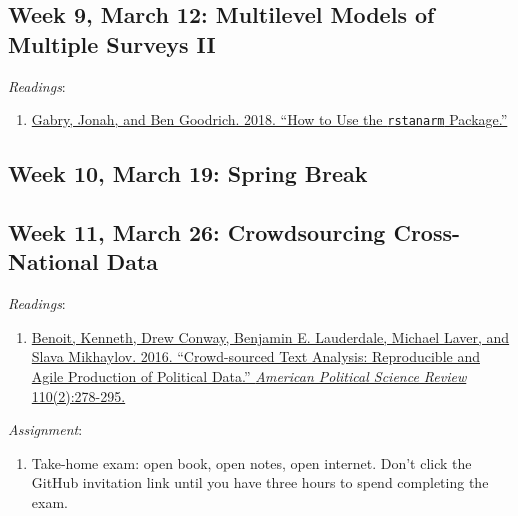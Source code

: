\documentclass[]{article}
\providecommand{\tightlist}{%
  \setlength{\itemsep}{0pt}\setlength{\parskip}{0pt}}
\begin{document}
\hypertarget{week-9-march-12-multilevel-models-of-multiple-surveys-ii}{%
\subsection{Week 9, March 12: Multilevel Models of Multiple Surveys
II}\label{week-9-march-12-multilevel-models-of-multiple-surveys-ii}}

\emph{Readings}:

\begin{enumerate}
\def\labelenumi{\arabic{enumi}.}
\tightlist
\item
  \href{http://mc-stan.org/rstanarm/articles/rstanarm.html}{Gabry,
  Jonah, and Ben Goodrich. 2018. ``How to Use the \texttt{rstanarm}
  Package.''}
\end{enumerate}

\hypertarget{week-10-march-19-spring-break}{%
\subsection{Week 10, March 19: Spring
Break}\label{week-10-march-19-spring-break}}

\hypertarget{week-11-march-26-crowdsourcing-cross-national-data}{%
\subsection{Week 11, March 26: Crowdsourcing Cross-National
Data}\label{week-11-march-26-crowdsourcing-cross-national-data}}

\emph{Readings}:

\begin{enumerate}
\def\labelenumi{\arabic{enumi}.}
\tightlist
\item
  \href{http://dx.doi.org.proxy.lib.uiowa.edu/10.1017/S0003055416000058}{Benoit,
  Kenneth, Drew Conway, Benjamin E. Lauderdale, Michael Laver, and Slava
  Mikhaylov. 2016. ``Crowd-sourced Text Analysis: Reproducible and Agile
  Production of Political Data.'' \emph{American Political Science
  Review} 110(2):278-295.}
\end{enumerate}

\emph{Assignment}:

\begin{enumerate}
\def\labelenumi{\arabic{enumi}.}
\tightlist
\item
  Take-home exam: open book, open notes, open internet. Don't click the
  GitHub invitation link until you have three hours to spend completing
  the exam.
\end{enumerate}
\end{document}
